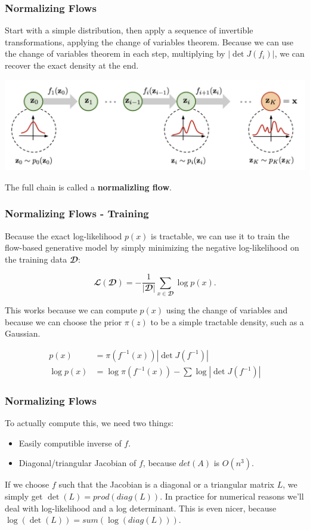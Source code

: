 \documentclass{beamer}
\begin{document}
\begin{frame}
  \frametitle{Normalizing Flows}

  Start with a simple distribution, then apply a sequence of invertible
  transformations, applying the change of variables theorem. Because we can use
  the change of variables theorem in each step, multiplying by $|\det J(f_i)|$,
  we can recover the exact density at the end.

  \includegraphics[width=1.0\textwidth]{normalizing-flow.png}

  The full chain is called a \textbf{normalizling flow}.
\end{frame}


\begin{frame}
  \frametitle{Normalizing Flows - Training}

  Because the exact log-likelihood $p(x)$ is tractable, we can use it to train
  the flow-based generative model by simply minimizing the negative log-likelihood
  on the training data $𝓓$:

  \[
    𝓛(𝓓) = -\frac{1}{|𝓓|} \sum_{x ∈ 𝓓} \log p(x).
  \]

  This works because we can compute $p(x)$ using the change of variables and
  because we can choose the prior $π(z)$ to be a simple tractable density, such
  as a Gaussian.

  \begin{align}
         p(x) &= π(f^{-1}(x)) |\det J(f^{-1})| \\
    \log p(x) &= \log π(f^{-1}(x)) - \sum \log |\det J(f^{-1})|
  \end{align}

\end{frame}


\begin{frame}
  \frametitle{Normalizing Flows}

  To actually compute this, we need two things:

  \begin{itemize}
    \item Easily computible inverse of $f$.
    \item Diagonal/triangular Jacobian of $f$, because $det(A)$ is $O(n^3)$.
  \end{itemize}

  If we choose $f$ such that the Jacobian is a diagonal or a triangular matrix
  $L$, we simply get $\det(L) = prod(diag(L))$.  In practice for numerical
  reasons we'll deal with log-likelihood and a log determinant.  This is even
  nicer, because $\log(\det(L)) = sum(\log(diag(L)))$.

\end{frame}
\end{document}

